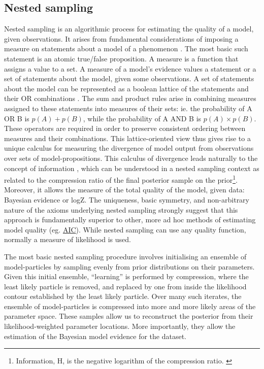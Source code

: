 \subsection{Nested sampling}
\label{ssec:nested}
Nested sampling is an algorithmic process for estimating the quality of a model, given observations. It arises from fundamental considerations of imposing a measure on statements about a model of a phenomenon \cite{Skilling2012}. The most basic such statement is an atomic true/false proposition. A measure is a function that assigns a value to a set. A measure of a model's evidence values a statement or a set of statements about the model, given some observations. A set of statements about the model can be represented as a boolean lattice of the statements and their OR combinations \cite{Knuth2012}. The sum and product rules arise in combining measures assigned to these statements into measures of their sets: ie. the probability of A OR B is $p(A) + p(B)$, while the probability of A AND B is $p(A) \times p(B)$. These operators are required in order to preserve consistent ordering between measures and their combinations. This lattice-oriented view thus gives rise to a unique calculus for measuring the divergence of model output from observations over sets of model-propositions\cite{Knuth2012}. This calculus of divergence leads naturally to the concept of information \cite{Skilling2012}, which can be understood in a nested sampling context as related to the compression ratio of the final posterior sample on the prior\footnote{Information, H, is the negative logarithm of the compression ratio. \cite{Skilling2006}}. Moreover, it allows the measure of the total quality of the model, given data: Bayesian evidence or logZ. The uniqueness, basic symmetry, and non-arbitrary nature of the axioms underlying nested sampling strongly suggest that this approach is fundamentally superior to other, more ad hoc methods of estimating model quality (eg. \hyperref[ssec:AIC]{AIC}). While nested sampling can use any quality function, normally a measure of likelihood is used.

The most basic nested sampling procedure involves initialising an ensemble of model-particles by sampling evenly from prior distributions on their parameters. Given this initial ensemble, ``learning'' is performed by compression, where the least likely particle is removed, and replaced by one from inside the likelihood contour established by the least likely particle. Over many such iterates, the ensemble of model-particles is compressed into more and more likely areas of the parameter space. These samples allow us to reconstruct the posterior from their likelihood-weighted parameter locations. More importantly, they allow the estimation of the Bayesian model evidence for the dataset.

